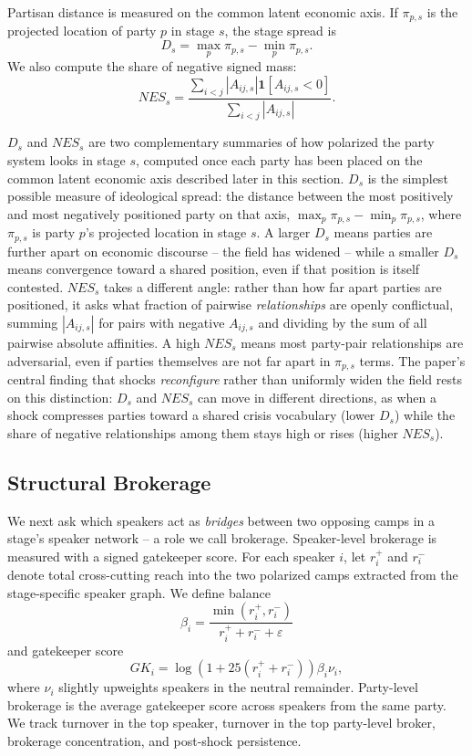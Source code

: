 \documentclass[conference]{IEEEtran}
\begin{document}
Partisan distance is measured on the common latent economic axis. If $\pi_{p,s}$ is the projected location of party $p$ in stage $s$, the stage spread is
\begin{equation}
D_s = \max_p \pi_{p,s} - \min_p \pi_{p,s}.
\end{equation}
We also compute the share of negative signed mass:
\begin{equation}
NES_s =
\frac{\sum_{i<j} |A_{ij,s}| \mathbf{1}[A_{ij,s}<0]}
{\sum_{i<j} |A_{ij,s}|}.
\end{equation}

$D_s$ and $NES_s$ are two complementary summaries of how polarized the party system looks in stage $s$, computed once each party has been placed on the common latent economic axis described later in this section. $D_s$ is the simplest possible measure of ideological spread: the distance between the most positively and most negatively positioned party on that axis, $\max_p \pi_{p,s} - \min_p \pi_{p,s}$, where $\pi_{p,s}$ is party $p$'s projected location in stage $s$. A larger $D_s$ means parties are further apart on economic discourse -- the field has widened -- while a smaller $D_s$ means convergence toward a shared position, even if that position is itself contested. $NES_s$ takes a different angle: rather than how far apart parties are positioned, it asks what fraction of pairwise \emph{relationships} are openly conflictual, summing $|A_{ij,s}|$ for pairs with negative $A_{ij,s}$ and dividing by the sum of all pairwise absolute affinities. A high $NES_s$ means most party-pair relationships are adversarial, even if parties themselves are not far apart in $\pi_{p,s}$ terms. The paper's central finding that shocks \emph{reconfigure} rather than uniformly widen the field rests on this distinction: $D_s$ and $NES_s$ can move in different directions, as when a shock compresses parties toward a shared crisis vocabulary (lower $D_s$) while the share of negative relationships among them stays high or rises (higher $NES_s$).

\subsection{Structural Brokerage}
We next ask which speakers act as \emph{bridges} between two opposing camps in a stage's speaker network -- a role we call brokerage. Speaker-level brokerage is measured with a signed gatekeeper score. For each speaker $i$, let $r_i^+$ and $r_i^-$ denote total cross-cutting reach into the two polarized camps extracted from the stage-specific speaker graph. We define balance
\begin{equation}
\beta_i = \frac{\min(r_i^+,r_i^-)}{r_i^+ + r_i^- + \varepsilon}
\end{equation}
and gatekeeper score
\begin{equation}
GK_i = \log\!\left(1 + 25(r_i^+ + r_i^-)\right)\beta_i \nu_i,
\end{equation}
where $\nu_i$ slightly upweights speakers in the neutral remainder. Party-level brokerage is the average gatekeeper score across speakers from the same party. We track turnover in the top speaker, turnover in the top party-level broker, brokerage concentration, and post-shock persistence.
\end{document}
